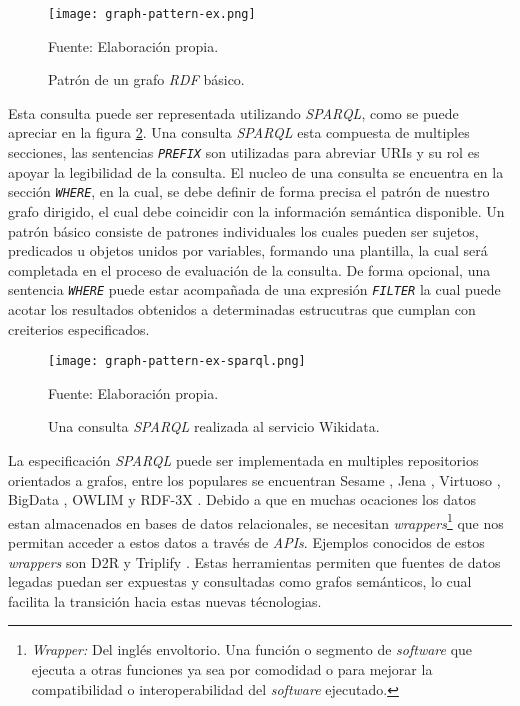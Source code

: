 \begin{figure}
    \centering
    \texttt{[image: graph-pattern-ex.png]}
    \caption{Patrón de un grafo \textit{RDF} básico. } Fuente: Elaboración
    propia.
    \label{fig:graph-pattern-ex}
\end{figure}

Esta consulta puede ser representada utilizando \textit{SPARQL}, como se puede
apreciar en la figura \ref{fig:graph-pattern-ex-sparql}. Una consulta
\textit{SPARQL} esta compuesta de multiples secciones, las sentencias
\textit{\texttt{PREFIX}} son utilizadas para abreviar URIs y su rol es apoyar la
legibilidad de la consulta. El nucleo de una consulta se encuentra en la sección
\textit{\texttt{WHERE}}, en la cual, se debe definir de forma precisa el patrón
de nuestro grafo dirigido, el cual debe coincidir con la información semántica
disponible. Un patrón básico consiste de patrones individuales los cuales pueden
ser sujetos, predicados u objetos unidos por variables, formando una plantilla,
la cual será completada en el proceso de evaluación de la consulta. De forma
opcional, una sentencia \textit{\texttt{WHERE}} puede estar acompañada de una
expresión \textit{\texttt{FILTER}} la cual puede acotar los resultados obtenidos
a determinadas estrucutras que cumplan con creiterios especificados.

\begin{figure}
    \centering
    \texttt{[image: graph-pattern-ex-sparql.png]}
    \caption{Una consulta \textit{SPARQL} realizada al servicio Wikidata.}
    Fuente: Elaboración propia.
    \label{fig:graph-pattern-ex-sparql}
\end{figure}


La especificación \textit{SPARQL} puede ser implementada en multiples
repositorios orientados a grafos, entre los populares se encuentran Sesame
\cite{broekstra2002sesame}, Jena \cite{mcbride2001jena}, Virtuoso
\cite{openlink2015virtuoso}, BigData \cite{thompson2016bigdata}, OWLIM
\cite{kiryakov2005owlim} y RDF-3X \cite{neumann2010rdf}. Debido a que en muchas
ocaciones los datos estan almacenados en bases de datos relacionales, se
necesitan \textit{wrappers}\footnote{\textit{Wrapper:} Del inglés envoltorio.
Una función o segmento de \textit{software} que ejecuta a otras funciones ya sea
por comodidad o para mejorar la compatibilidad o interoperabilidad del
\textit{software} ejecutado.} que nos permitan acceder a estos datos a través de
\textit{APIs}. Ejemplos conocidos de estos \textit{wrappers} son D2R
\cite{bizer2006d2r} y Triplify \cite{auer2009triplify}. Estas herramientas
permiten que fuentes de datos legadas puedan ser expuestas y consultadas como
grafos semánticos, lo cual facilita la transición hacia estas nuevas
técnologias.


